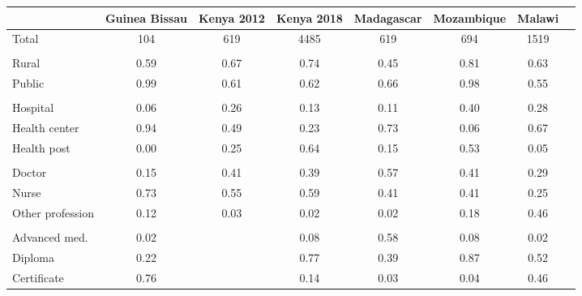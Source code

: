 \def\sym#1{\ifmmode^{#1}\else\(^{#1}\)\fi}
\begin{tabular}{l*{7}{c}}
\hline\hline
&\multicolumn{1}{c}{Guinea Bissau}&\multicolumn{1}{c}{Kenya 2012}&\multicolumn{1}{c}{Kenya 2018}&\multicolumn{1}{c}{Madagascar}&\multicolumn{1}{c}{Mozambique}&\multicolumn{1}{c}{Malawi}&\\
\hline
Total&                                         {104}&        {619}&  {4485}&      {619}&        {694}&        {1519}\\
  &  {}\\
Rural&                                         {0.59}&        {0.67}&  {0.74}&  {0.45}&    {0.81}&        {0.63}\\
Public&                                        {0.99}&        {0.61}&  {0.62}&  {0.66}&    {0.98}&        {0.55}\\
 &   {}\\
Hospital&                              {0.06}&        {0.26}&  {0.13}&  {0.11}&    {0.40}&        {0.28}\\
Health center&                         {0.94}&        {0.49}&  {0.23}&      {0.73}&        {0.06}&        {0.67}\\
Health post&                           {0.00}&        {0.25}&  {0.64}&  {0.15}&    {0.53}&        {0.05}\\
 &   {}\\
Doctor&                                        {0.15}&        {0.41}&  {0.39}&  {0.57}&    {0.41}&        {0.29}\\
Nurse&                                         {0.73}&        {0.55}&  {0.59}&  {0.41}&    {0.41}&        {0.25}\\
Other profession&                      {0.12}&        {0.03}&  {0.02}&  {0.02}&    {0.18}&        {0.46}\\
&   {}\\
Advanced med.&                         {0.02}&        {}&  {0.08}&  {0.58}&    {0.08}&        {0.02}\\
Diploma&                                       {0.22}&        {}&  {0.77}&  {0.39}&    {0.87}&        {0.52}\\
Certificate&                           {0.76}&        {}&  {0.14}&  {0.03}&    {0.04}&        {0.46}\\
\hline
\end{tabular}